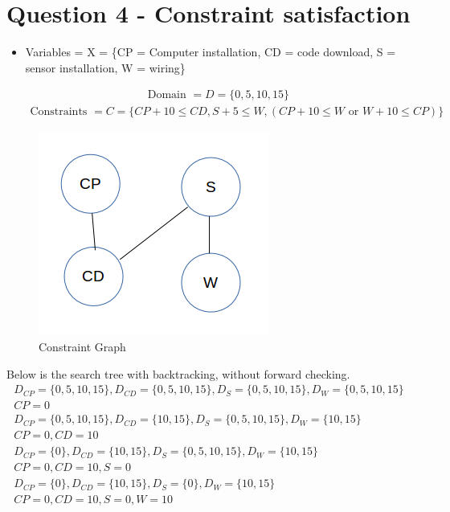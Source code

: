 \documentclass{article}
\begin{document}
\section{Question 4 - Constraint satisfaction}
\begin{itemize}
    \item
        Variables = X = \{CP = Computer installation, CD = code download, S = sensor installation, W = wiring\}
        \par
        \begin{gather*}
            \mbox{Domain } = D = \{0, 5, 10, 15\}
        \end{gather*}
        \begin{gather*}
            \mbox{Constraints } = C = \{CP + 10 \leq CD, S + 5 \leq W, (CP + 10 \leq W \mbox{ or } W + 10 \leq CP)\}
        \end{gather*}
\end{itemize}
\begin{figure}
    \centering
    \caption{Constraint Graph}
    \includegraphics[keepaspectratio=true,scale=0.75]{constraint-graph}
\end{figure}
Below is the search tree with backtracking, without forward checking.
\begin{gather*}
    D_{CP} = \{0, 5, 10, 15\}, D_{CD} = \{0, 5, 10, 15\}, D_{S} = \{0, 5, 10, 15\}, D_{W} = \{0, 5, 10, 15\} \\
    CP = 0 \\
    D_{CP} = \{0, 5, 10, 15\}, D_{CD} = \{10, 15\}, D_{S} = \{0, 5, 10, 15\}, D_{W} = \{10, 15\} \\
    CP = 0, CD = 10 \\
    D_{CP} = \{0\}, D_{CD} = \{10, 15\}, D_{S} = \{0, 5, 10, 15\}, D_{W} = \{10, 15\} \\
    CP = 0, CD = 10, S = 0 \\
    D_{CP} = \{0\}, D_{CD} = \{10, 15\}, D_{S} = \{0\}, D_{W} = \{10, 15\} \\
    CP = 0, CD = 10, S = 0, W = 10
\end{gather*}
\end{document}
